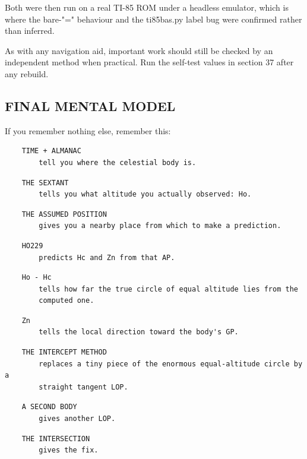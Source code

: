 \documentclass[11pt]{article}
\begin{document}
Both were then run on a real TI-85 ROM under a headless emulator, which is where the bare-"=" behaviour and the ti85bas.py label bug were confirmed rather than inferred.

As with any navigation aid, important work should still be checked by an independent method when practical. Run the self-test values in section 37 after any rebuild.

\subsection*{FINAL MENTAL MODEL}

If you remember nothing else, remember this:

\begin{verbatim}
    TIME + ALMANAC
        tell you where the celestial body is.
\end{verbatim}

\begin{verbatim}
    THE SEXTANT
        tells you what altitude you actually observed: Ho.
\end{verbatim}

\begin{verbatim}
    THE ASSUMED POSITION
        gives you a nearby place from which to make a prediction.
\end{verbatim}

\begin{verbatim}
    HO229
        predicts Hc and Zn from that AP.
\end{verbatim}

\begin{verbatim}
    Ho - Hc
        tells how far the true circle of equal altitude lies from the
        computed one.
\end{verbatim}

\begin{verbatim}
    Zn
        tells the local direction toward the body's GP.
\end{verbatim}

\begin{verbatim}
    THE INTERCEPT METHOD
        replaces a tiny piece of the enormous equal-altitude circle by a
        straight tangent LOP.
\end{verbatim}

\begin{verbatim}
    A SECOND BODY
        gives another LOP.
\end{verbatim}

\begin{verbatim}
    THE INTERSECTION
        gives the fix.
\end{verbatim}
\end{document}
